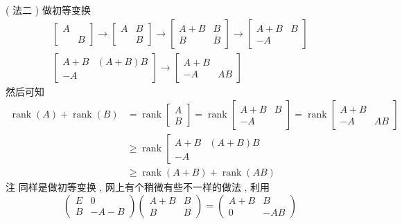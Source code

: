 \documentclass[10pt]{article}
\begin{document}
( 法二 )  做初等变换 
$$
\begin{gathered}
{\left[\begin{array}{cc}
A & \\
& B
\end{array}\right] \rightarrow\left[\begin{array}{ll}
A & B \\
& B
\end{array}\right] \rightarrow\left[\begin{array}{cc}
A+B & B \\
B & B
\end{array}\right] \rightarrow\left[\begin{array}{cc}
A+B & B \\
-A &
\end{array}\right]} \\
{\left[\begin{array}{cc}
A+B & (A+B) B \\
-A &
\end{array}\right] \rightarrow\left[\begin{array}{cc}
A+B & \\
-A & A B
\end{array}\right]}
\end{gathered}
$$
 然后可知 
$$
\begin{aligned}
\operatorname{rank}(A)+\operatorname{rank}(B) &=\operatorname{rank}\left[\begin{array}{ll}
A \\
B
\end{array}\right]=\operatorname{rank}\left[\begin{array}{cc}
A+B & B \\
-A &
\end{array}\right]=\operatorname{rank}\left[\begin{array}{cc}
A+B & \\
-A & A B
\end{array}\right] \\
& \geqslant \operatorname{rank}\left[\begin{array}{cc}
A+B & (A+B) B \\
-A
\end{array}\right.\\
& \geqslant \operatorname{rank}(A+B)+\operatorname{rank}(A B)
\end{aligned}
$$
 注   同样是做初等变换 ,  网上有个稍微有些不一样的做法 ,  利用 
$$
\left(\begin{array}{cc}
E & 0 \\
B & -A-B
\end{array}\right)\left(\begin{array}{cc}
A+B & B \\
B & B
\end{array}\right)=\left(\begin{array}{cc}
A+B & B \\
0 & -A B
\end{array}\right)
$$
\end{document}
